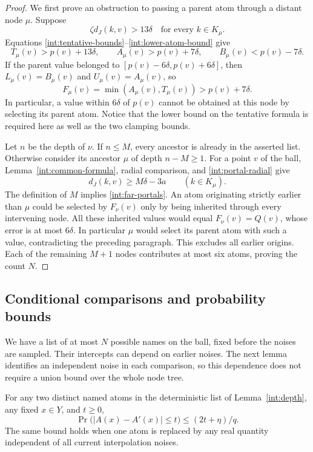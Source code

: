 \begin{proof}
We first prove an obstruction to passing a parent atom through a
distant node $\mu$.  Suppose
\begin{equation}\label{int:far-portals}
 \zeta d_J(k,v)>13\delta\quad\text{for every }k\in K_\mu.
\end{equation}
Equations \eqref{int:tentative-bounds}--\eqref{int:lower-atom-bound}
give
\[
 T_\mu(v)>p(v)+13\delta,\qquad
 A_\mu(v)>p(v)+7\delta,\qquad
 B_\mu(v)<p(v)-7\delta.
\]
If the parent value belonged to $[p(v)-6\delta,p(v)+6\delta]$, then
$L_\mu(v)=B_\mu(v)$ and $U_\mu(v)=A_\mu(v)$, so
\[
 F_\mu(v)=\min(A_\mu(v),T_\mu(v))>p(v)+7\delta.
\]
In particular, a value within $6\delta$ of $p(v)$ cannot be obtained
at this node by selecting its parent atom.  Notice that the lower
bound on the tentative formula is required here as well as the two
clamping bounds.

Let $n$ be the depth of $\nu$.  If $n\le M$, every ancestor is already
in the asserted list.  Otherwise consider its ancestor $\mu$ of
depth $n-M\ge1$.  For a point $v$ of the ball,
Lemma~\ref{int:common-formula}, radial comparison, and
\eqref{int:portal-radial} give
\[
 d_J(k,v)\ge M\delta-3a\qquad(k\in K_\mu).
\]
The definition of $M$ implies \eqref{int:far-portals}.  An atom
originating strictly earlier than $\mu$ could be selected by $F_\nu(v)$
only by being inherited through every intervening node.  All these
inherited values would equal $F_\nu(v)=Q(v)$, whose error is at most
$6\delta$.  In particular $\mu$ would select its parent atom with
such a value, contradicting the preceding paragraph.  This excludes
all earlier origins.  Each of the remaining $M+1$ nodes contributes
at most six atoms, proving the count $N$.
\end{proof}

\subsection{Conditional comparisons and probability bounds}

We have a list of at most $N$ possible names on the ball, fixed before the
noises are sampled.  Their intercepts can depend on earlier noises.
The next lemma identifies an independent noise in each comparison, so
this dependence does not require a union bound over the whole node tree.

\begin{lemma}\label{int:near-tie}
For any two distinct named atoms in the deterministic list of
Lemma~\ref{int:depth}, any fixed $x\in Y$, and $t\ge0$,
\begin{equation}\label{int:near-tie-bound}
 \Pr\bigl(|A(x)-A'(x)|\le t\bigr)\le(2t+\eta)/q.
\end{equation}
The same bound holds when one atom is replaced by any real quantity
independent of all current interpolation noises.
\end{lemma}

